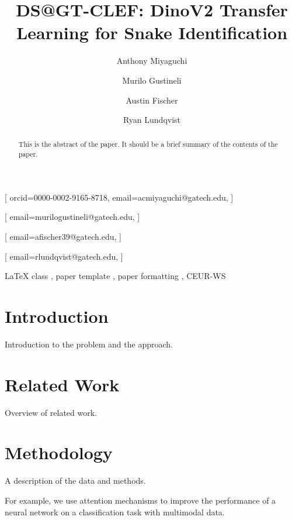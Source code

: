 \documentclass[]{style/ceurart}
\begin{document}


\title{DS@GT-CLEF: DinoV2 Transfer Learning for Snake Identification}

\author[1]{Anthony Miyaguchi}[
orcid=0000-0002-9165-8718,
email=acmiyaguchi@gatech.edu,
]
\cormark[1]
\author[1]{Murilo Gustineli}[
email=murilogustineli@gatech.edu,
]
\cormark[1]
\author[1]{Austin Fischer}[
email=afischer39@gatech.edu,
]
\author[1]{Ryan Lundqvist}[
email=rlundqvist@gatech.edu,
]

\address[1]{Georgia Institute of Technology, North Ave NW, Atlanta, GA 30332}


\begin{abstract}
    This is the abstract of the paper. 
    It should be a brief summary of the contents of the paper.
\end{abstract}

\begin{keywords}
  LaTeX class \sep
  paper template \sep
  paper formatting \sep
  CEUR-WS
\end{keywords}


\maketitle

\section{Introduction}

Introduction to the problem and the approach.

\section{Related Work}

Overview of related work.

\section{Methodology}

A description of the data and methods.

For example, we use attention mechanisms \cite{vaswani2017attention} to improve the performance of a neural network on a classification task with multimodal data.
\end{document}
